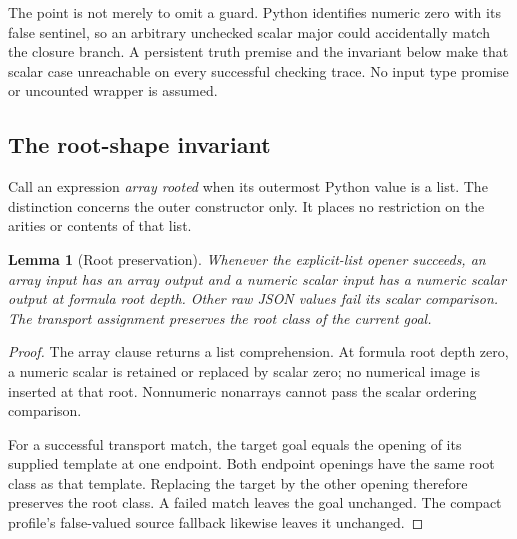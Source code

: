 \documentclass[11pt,letterpaper]{article}
\newtheorem{lemma}[theorem]{Lemma}
\theoremstyle{definition}\newtheorem{definition}[theorem]{Definition}
\theoremstyle{remark}\newtheorem{remark}[theorem]{Remark}
\begin{document}
The point is not merely to omit a guard.  Python identifies numeric
zero with its false sentinel, so an arbitrary unchecked scalar major
could accidentally match the closure branch.  A persistent truth premise
and the invariant below make that scalar case unreachable on every
successful checking trace.  No input type promise or uncounted wrapper
is assumed.

\subsection{The root-shape invariant}

Call an expression \emph{array rooted} when its outermost Python value
is a list.  The distinction concerns the outer constructor only.
It places no restriction on the arities or contents of that list.

\begin{lemma}[Root preservation]
Whenever the explicit-list opener succeeds, an array input has an array
output and a numeric scalar input has a numeric scalar output at formula
root depth.  Other raw JSON values fail its scalar comparison.
The transport assignment preserves the root class of the current goal.
\end{lemma}
\begin{proof}
The array clause returns a list comprehension.  At formula root depth
zero, a numeric scalar is retained or replaced by scalar zero; no numerical
image is inserted at that root.  Nonnumeric nonarrays cannot pass the
scalar ordering comparison.

For a successful transport match, the target goal equals the opening
of its supplied template at one endpoint.  Both endpoint openings have
the same root class as that template.  Replacing the target by the other
opening therefore preserves the root class. A failed match leaves the
goal unchanged. The compact profile's false-valued source fallback
likewise leaves it unchanged.
\end{proof}
\end{document}
